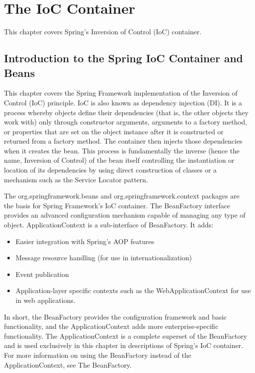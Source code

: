 \chapter{The IoC Container}
This chapter covers Spring’s Inversion of Control (IoC) container.

\section{Introduction to the Spring IoC Container and Beans}
This chapter covers the Spring Framework implementation of the Inversion of Control (IoC)
principle. IoC is also known as dependency injection (DI). It is a process whereby objects define
their dependencies (that is, the other objects they work with) only through constructor arguments,
arguments to a factory method, or properties that are set on the object instance after it is
constructed or returned from a factory method. The container then injects those dependencies
when it creates the bean. This process is fundamentally the inverse (hence the name, Inversion of
Control) of the bean itself controlling the instantiation or location of its dependencies by using
direct construction of classes or a mechanism such as the Service Locator pattern.

The org.springframework.beans and org.springframework.context packages are the basis for Spring
Framework’s IoC container. The BeanFactory interface provides an advanced configuration
mechanism capable of managing any type of object. ApplicationContext is a sub-interface of
BeanFactory. It adds:

\begin{itemize}
    \item Easier integration with Spring’s AOP features
    \item Message resource handling (for use in internationalization)
    \item Event publication
    \item Application-layer specific contexts such as the WebApplicationContext for use in web
    applications.
\end{itemize}

In short, the BeanFactory provides the configuration framework and basic functionality, and the
ApplicationContext adds more enterprise-specific functionality. The ApplicationContext is a
complete superset of the BeanFactory and is used exclusively in this chapter in descriptions of
Spring’s IoC container. For more information on using the BeanFactory instead of the
ApplicationContext, see The BeanFactory.

